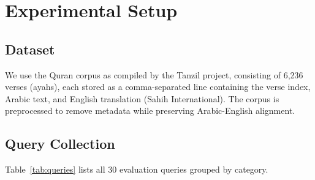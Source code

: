 \documentclass[conference]{IEEEtran}
\begin{document}
\section{Experimental Setup}

\subsection{Dataset}

We use the Quran corpus as compiled by the Tanzil project, consisting
of 6,236 verses (ayahs), each stored as a comma-separated line containing
the verse index, Arabic text, and English translation (Sahih
International). The corpus is preprocessed to remove metadata while
preserving Arabic-English alignment.

\subsection{Query Collection}

Table~\ref{tab:queries} lists all 30 evaluation queries grouped by
category.
\end{document}
